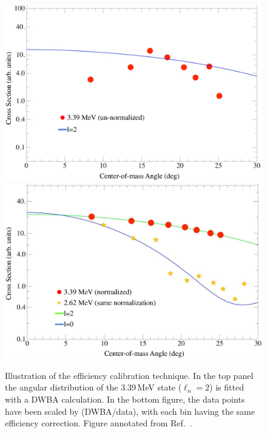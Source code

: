 \begin{figure}%
\centering
\includegraphics[height=0.45\textheight,width=\columnwidth,keepaspectratio]{../More_Figures/b12_unnorm.eps}\\
\includegraphics[height=0.45\textheight,width=0.98\columnwidth,keepaspectratio]{../More_Figures/b12_norm.eps}%
\caption[Illustration of the efficiency calibration technique]{Illustration of the efficiency calibration technique.  In the top panel the angular distribution of the 3.39\,MeV state ($\ell_n=2$) is fitted with a DWBA calculation.  In the bottom figure, the data points have been scaled by (DWBA/data), with each bin having the same efficiency correction. Figure annotated from Ref.~\cite{Schiffer_2009PC}.}%
\label{b12angdist2}%
\end{figure}

